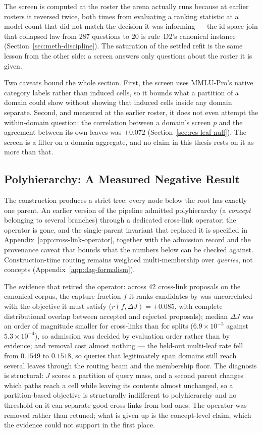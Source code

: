 The screen is computed at the roster the arena actually runs because
at earlier rosters it reversed twice, both times from evaluating a
ranking statistic at a model count that did not match the decision it
was informing --- the id-space join that collapsed law from 287
questions to 20 is rule~D2's canonical instance
(Section~\ref{sec:meth-discipline}). The saturation of the settled
refit is the same lesson from the other side: a screen answers only
questions about the roster it is given.

Two caveats bound the whole section. First, the screen uses MMLU-Pro's
native category labels rather than induced cells, so it bounds what a
partition of a domain could show without showing that induced cells
inside any domain separate. Second, and measured at the earlier
roster, it does not even attempt the within-domain question: the
correlation between a domain's screen $p$ and the agreement between
its own leaves was $+0.072$ (Section~\ref{sec:res-leaf-null}). The
screen is a filter on a domain aggregate, and no claim in this thesis
rests on it as more than that.

\subsection{Polyhierarchy: A Measured Negative Result}\label{sec:poly-negative}

The construction produces a strict tree: every node below the root
has exactly one parent. An earlier version of the pipeline admitted
polyhierarchy (a \emph{concept} belonging to several branches) through
a dedicated cross-link operator; the operator is gone, and the
single-parent invariant that replaced it is specified in
Appendix~\ref{app:cross-link-operator}, together with the admission
record and the provenance caveat that bounds what the numbers below
can be checked against. Construction-time routing remains weighted
multi-membership over \emph{queries}, not concepts
(Appendix~\ref{app:dag-formalism}).

The evidence that retired the operator: across 42 cross-link proposals
on the canonical corpus, the capture fraction $f$ it ranks candidates
by was uncorrelated with the objective it must satisfy
($r(f, \Delta J) = +0.085$, with complete distributional overlap
between accepted and rejected proposals); median $\Delta J$ was an
order of magnitude smaller for cross-links than for splits
($6.9 \times 10^{-5}$ against $5.3 \times 10^{-4}$), so admission was
decided by evaluation order rather than by evidence; and removal cost
almost nothing --- the held-out multi-leaf rate fell from $0.1549$ to
$0.1518$, so queries that legitimately span domains still reach
several leaves through the routing beam and the membership floor. The
diagnosis is structural: $J$ scores a partition of query mass, and a
second parent changes which paths reach a cell while leaving its
contents almost unchanged, so a partition-based objective is
structurally indifferent to polyhierarchy and no threshold on it can
separate good cross-links from bad ones. The operator was removed
rather than retuned; what is given up is the concept-level claim,
which the evidence could not support in the first place.

